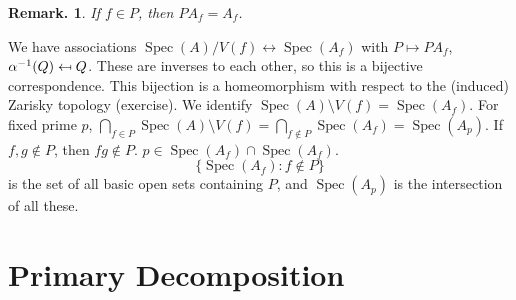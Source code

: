 \documentclass[11pt, a4paper]{memoir}
\newcommand{\mapsfrom}[0]{\mathrel{\reflectbox{\ensuremath{\mapsto}}}}
\theoremstyle{change}
\theoremstyle{plain}
\theoremstyle{nonumberplain}
\newtheorem{remark}{Remark.}
\DeclareMathOperator{\Spec}{Spec}
\numberwithin{equation}{section}
\begin{document}
\begin{remark}
    If $f\in P$, then $PA_f=A_f$.
\end{remark}
We have associations $\Spec(A)/V(f)\leftrightarrow\Spec(A_f)$ with $P\mapsto PA_f$, $\alpha^{-1}(Q)\mapsfrom Q$.
These are inverses to each other, so this is a bijective correspondence.
This bijection is a homeomorphism with respect to the (induced) Zarisky topology (exercise).
We identify $\Spec(A)\setminus V(f)=\Spec(A_f)$.
For fixed prime $p$, $\bigcap_{f\in P}\Spec(A)\setminus V(f)=\bigcap_{f\notin P}\Spec(A_f)=\Spec(A_p)$.
If $f,g\notin P$, then $fg\notin P$.
$p\in\Spec(A_f)\cap\Spec(A_f)$.
\begin{equation*}
    \{\Spec(A_f):f\notin P\}
\end{equation*}
is the set of all basic open sets containing $P$, and $\Spec(A_p)$ is the intersection of all these.
\chapter{Primary Decomposition}
\end{document}
